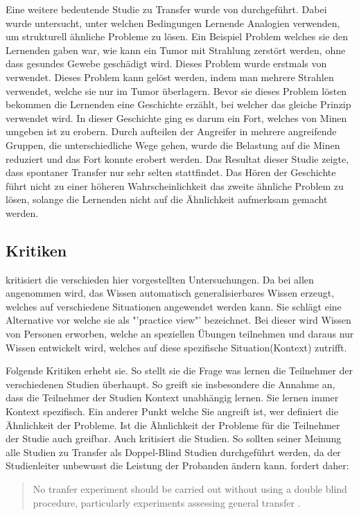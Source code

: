 Eine weitere bedeutende Studie zu Transfer wurde von \citet{Gick1980} durchgeführt. Dabei wurde untersucht, unter welchen Bedingungen Lernende Analogien verwenden, um strukturell ähnliche Probleme zu lösen. Ein Beispiel Problem welches sie den Lernenden gaben war, wie kann ein Tumor mit Strahlung zerstört werden, ohne dass gesundes Gewebe geschädigt wird. Dieses Problem wurde erstmals von \citet{Duncker1945} verwendet. Dieses Problem kann gelöst werden, indem man mehrere Strahlen verwendet, welche sie nur im Tumor überlagern. Bevor sie dieses Problem lösten bekommen die Lernenden eine Geschichte erzählt, bei welcher das gleiche Prinzip verwendet wird. In dieser Geschichte ging es darum ein Fort, welches von Minen umgeben ist zu erobern. Durch aufteilen der Angreifer in mehrere angreifende Gruppen, die unterschiedliche Wege gehen, wurde die Belastung auf die Minen reduziert und das Fort konnte erobert werden. Das Resultat dieser Studie zeigte, dass spontaner Transfer nur sehr selten stattfindet. Das Hören der Geschichte führt nicht zu einer höheren Wahrscheinlichkeit das zweite ähnliche Problem zu lösen, solange die Lernenden nicht auf die Ähnlichkeit aufmerksam gemacht werden.

\subsection{Kritiken}

\citet{Lave1988} kritisiert die verschieden hier vorgestellten Untersuchungen. Da bei allen angenommen wird, das  Wissen automatisch generalisierbares Wissen erzeugt, welches auf verschiedene Situationen angewendet werden kann. Sie schlägt eine Alternative vor welche sie als "'practice view"' bezeichnet. Bei dieser wird Wissen von Personen erworben, welche an speziellen Übungen teilnehmen und daraus nur Wissen entwickelt wird, welches auf diese spezifische Situation(Kontext) zutrifft.

Folgende Kritiken erhebt sie. So stellt sie die Frage was lernen die Teilnehmer der verschiedenen Studien überhaupt. So greift sie insbesondere die Annahme an, dass die Teilnehmer der Studien Kontext unabhängig lernen. Sie lernen immer Kontext spezifisch. Ein anderer Punkt welche Sie angreift ist, wer definiert die Ähnlichkeit der Probleme. Ist die Ähnlichkeit der Probleme für die Teilnehmer der Studie auch greifbar. Auch \citet{Detterman1993} kritisiert die Studien. So sollten seiner Meinung alle Studien zu Transfer als Doppel-Blind Studien durchgeführt werden, da der Studienleiter unbewusst die Leistung der Probanden ändern kann. \citeauthor{Detterman1993} fordert daher:
\begin{quote}
No tranfer experiment should be carried out without using a double blind procedure, particularly experiments assessing general transfer \citet[S. 10]{Detterman1993}.
\end{quote}





